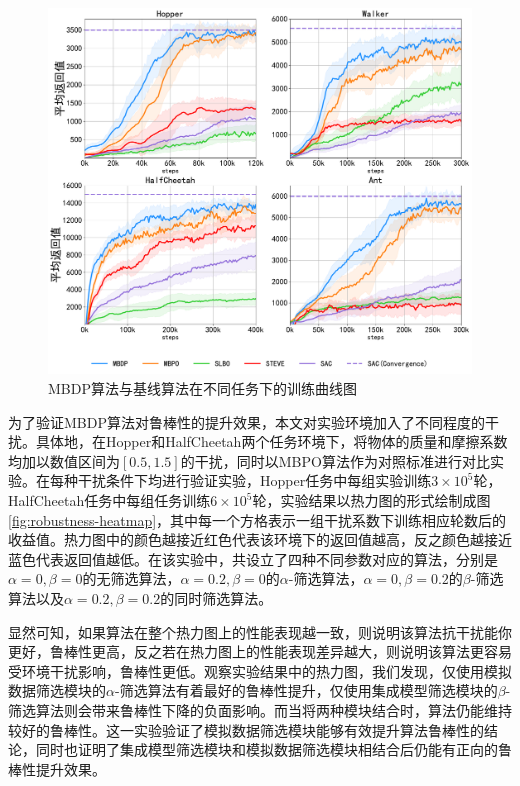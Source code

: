 \begin{figure}[t]
  \centering
  \includegraphics[width=\textwidth]{figures/performance.pdf}
  \caption{MBDP算法与基线算法在不同任务下的训练曲线图}
  \label{fig:performance}
\end{figure}

为了验证MBDP算法对鲁棒性的提升效果，本文对实验环境加入了不同程度的干扰。具体地，在Hopper和HalfCheetah两个任务环境下，将物体的质量和摩擦系数均加以数值区间为$[0.5,1.5]$的干扰，同时以MBPO算法作为对照标准进行对比实验。在每种干扰条件下均进行验证实验，Hopper任务中每组实验训练$3\times 10^5$轮，HalfCheetah任务中每组任务训练$6\times 10^5$轮，实验结果以热力图的形式绘制成图\ref{fig:robustness-heatmap}，其中每一个方格表示一组干扰系数下训练相应轮数后的收益值。热力图中的颜色越接近红色代表该环境下的返回值越高，反之颜色越接近蓝色代表返回值越低。在该实验中，共设立了四种不同参数对应的算法，分别是$\alpha=0, \beta=0$的无筛选算法，$\alpha=0.2, \beta=0$的$\alpha$-筛选算法，$\alpha=0, \beta=0.2$的$\beta$-筛选算法以及$\alpha=0.2, \beta=0.2$的同时筛选算法。

显然可知，如果算法在整个热力图上的性能表现越一致，则说明该算法抗干扰能你更好，鲁棒性更高，反之若在热力图上的性能表现差异越大，则说明该算法更容易受环境干扰影响，鲁棒性更低。观察实验结果中的热力图，我们发现，仅使用模拟数据筛选模块的$\alpha$-筛选算法有着最好的鲁棒性提升，仅使用集成模型筛选模块的$\beta$-筛选算法则会带来鲁棒性下降的负面影响。而当将两种模块结合时，算法仍能维持较好的鲁棒性。这一实验验证了模拟数据筛选模块能够有效提升算法鲁棒性的结论，同时也证明了集成模型筛选模块和模拟数据筛选模块相结合后仍能有正向的鲁棒性提升效果。

